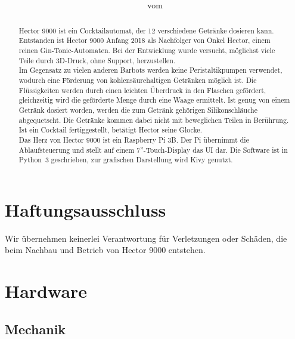 \documentclass[a4paper]{scrartcl}
\title{ ~\\[2cm] {\Huge\tit} \\ {\aw}}
\author{\er}
\date{\small \DocNr{} vom \stand}
\begin{document}
\maketitle
\vspace*{\fill} %
\begin{abstract}
\noindent
Hector 9000 ist ein Cocktailautomat, der 12 verschiedene Getränke dosieren kann. Entstanden ist Hector 9000 Anfang 2018 als Nachfolger von Onkel Hector, einem reinen Gin-Tonic-Automaten. Bei der Entwicklung wurde versucht, möglichst viele Teile durch 3D-Druck, ohne Support, herzustellen.\\
Im Gegensatz zu vielen anderen Barbots werden keine Peristaltikpumpen verwendet, wodurch eine Förderung von kohlensäurehaltigen Getränken möglich ist. Die Flüssigkeiten werden durch einen leichten Überdruck in den Flaschen gefördert, gleichzeitig wird die geförderte Menge durch eine Waage ermittelt. Ist genug von einem Getränk dosiert worden, werden die zum Getränk gehörigen Silikonschläuche abgequetscht. Die Getränke kommen dabei nicht mit beweglichen Teilen in Berührung. Ist ein Cocktail fertiggestellt, betätigt Hector seine Glocke.\\
Das Herz von Hector 9000 ist ein Raspberry Pi 3B. Der Pi übernimmt die Ablaufsteuerung und stellt auf einem 7''-Touch-Display das UI dar.
Die Software ist in Python~3 geschrieben, zur grafischen Darstellung wird Kivy genutzt.
\end{abstract}


\FloatBarrier
\newpage
\tableofcontents

\listoffigures

\listoftables
\newpage

\section{Haftungsausschluss}
Wir übernehmen keinerlei Verantwortung für Verletzungen oder Schäden, die beim Nachbau und Betrieb von Hector 9000 entstehen. 

\section{Hardware}
\subsection{Mechanik}
\end{document}
